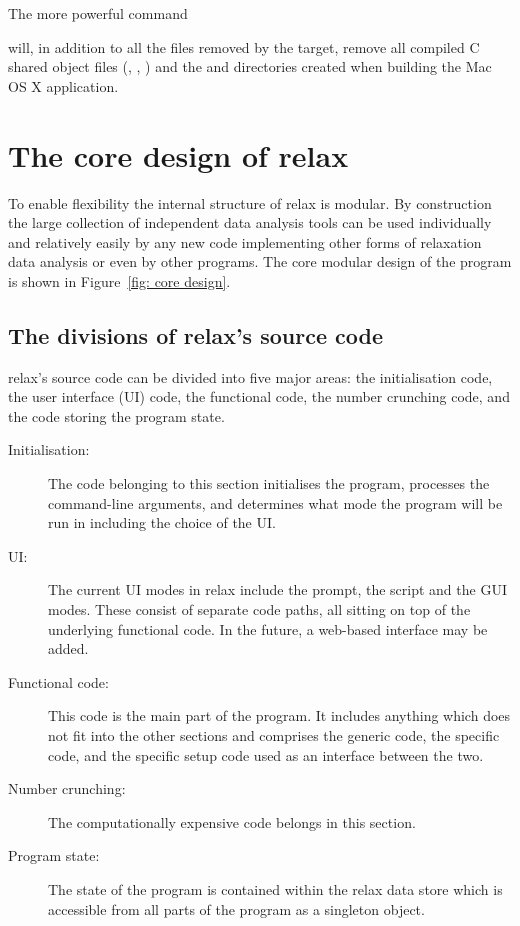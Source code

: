 The more powerful command


will, in addition to all the files removed by the  target, remove all compiled C shared object files (, , ) and the  and  directories created when building the Mac OS X application.




\section{The core design of relax}

To enable flexibility the internal structure of relax is modular.  By construction the large collection of independent data analysis tools can be used individually and relatively easily by any new code implementing other forms of relaxation data analysis or even by other programs.  The core modular design of the program is shown in Figure~\ref{fig: core design}.



\subsection{The divisions of relax's source code}

relax's source code can be divided into five major areas:  the initialisation code, the user interface (UI) code, the functional code, the number crunching code, and the code storing the program state.

\begin{description}
\item[Initialisation:]  The code belonging to this section initialises the program, processes the command-line arguments, and determines what mode the program will be run in including the choice of the UI.

\item[UI:]  The current UI modes in relax include the prompt, the script and the GUI modes.  These consist of separate code paths, all sitting on top of the underlying functional code.  In the future, a web-based interface may be added.

\item[Functional code:]  This code is the main part of the program.  It includes anything which does not fit into the other sections and comprises the generic code, the specific code, and the specific setup code used as an interface between the two.

\item[Number crunching:]  The computationally expensive code belongs in this section.

\item[Program state:]  The state of the program is contained within the relax data store which is accessible from all parts of the program as a singleton object.
\end{description}

